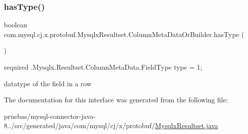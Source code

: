 \subsubsection{\texorpdfstring{has\+Type()}{hasType()}}
{\footnotesize\ttfamily boolean com.\+mysql.\+cj.\+x.\+protobuf.\+Mysqlx\+Resultset.\+Column\+Meta\+Data\+Or\+Builder.\+has\+Type (\begin{DoxyParamCaption}{ }\end{DoxyParamCaption})}

{\ttfamily required .Mysqlx.\+Resultset.\+Column\+Meta\+Data.\+Field\+Type type = 1;}


\begin{DoxyPre}
datatype of the field in a row
\end{DoxyPre}
 

The documentation for this interface was generated from the following file\+:\begin{DoxyCompactItemize}
\item 
pruebas/mysql-\/connector-\/java-\/8../src/generated/java/com/mysql/cj/x/protobuf/\mbox{\hyperlink{_mysqlx_resultset_8java}{Mysqlx\+Resultset.\+java}}\end{DoxyCompactItemize}
